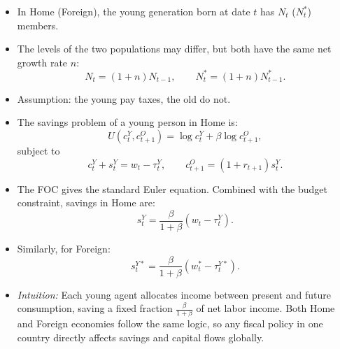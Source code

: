 \documentclass[12pt]{article}
\begin{document}
\begin{itemize}
  \item In Home (Foreign), the young generation born at date $t$ has $N_t$ ($N_t^*$) members.

  \item The levels of the two populations may differ, but both have the same net growth rate $n$:
  \[
  N_t = (1+n)N_{t-1}, 
  \qquad 
  N_t^* = (1+n)N_{t-1}^*.
  \]

  \item Assumption: the young pay taxes, the old do not.

  \item The savings problem of a young person in Home is:
  \[
  U(c_t^Y, c_{t+1}^O) = \log c_t^Y + \beta \log c_{t+1}^O,
  \]
  subject to
  \[
  c_t^Y + s_t^Y = w_t - \tau_t^Y, 
  \qquad 
  c_{t+1}^O = (1+r_{t+1})s_t^Y.
  \]

  \item The FOC gives the standard Euler equation. Combined with the budget constraint, savings in Home are:
  \[
  s_t^Y = \frac{\beta}{1+\beta}(w_t - \tau_t^Y). \tag{30}
  \]

  \item Similarly, for Foreign:
  \[
  s_t^{Y*} = \frac{\beta}{1+\beta}(w_t^* - \tau_t^{Y*}).
  \]

  \item \textit{Intuition:} Each young agent allocates income between present and future consumption, saving a fixed fraction $\tfrac{\beta}{1+\beta}$ of net labor income. Both Home and Foreign economies follow the same logic, so any fiscal policy in one country directly affects savings and capital flows globally.
\end{itemize}
\end{document}
